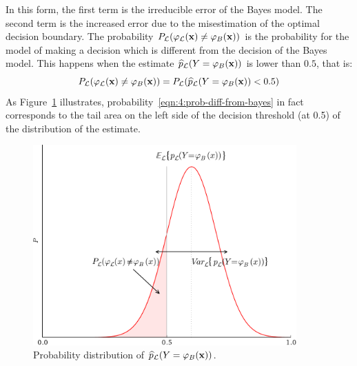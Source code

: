 In this form, the first term is the irreducible error of the Bayes model. The
second term is the increased error due to the misestimation of the optimal
decision boundary. The probability $P_{\cal L}(\varphi_{\cal L}(\mathbf{x})\neq
\varphi_B(\mathbf{x}))$  is the probability for the model of making a decision
which is different from the decision of the Bayes model. This happens
when the estimate $\widehat{p}_{\cal L}(Y=\varphi_B(\mathbf{x}))$ is lower
than $0.5$, that is:
\begin{equation}\label{eqn:4:prob-diff-from-bayes}
P_{\cal L}(\varphi_{\cal L}(\mathbf{x})\neq \varphi_B(\mathbf{x})) = P_{\cal L}(\widehat{p}_{\cal L}(Y=\varphi_B(\mathbf{x})) < 0.5)
\end{equation}
As Figure~\ref{fig:estimate-distribution} illustrates, probability~\ref{eqn:4:prob-diff-from-bayes}
in fact corresponds to the tail area on the left side
of the decision threshold (at 0.5) of the distribution of the estimate.

\begin{figure}
    \centering
    \includegraphics[width=0.9\textwidth]{figures/ch4_estimate_distribution.pdf}
    \caption{Probability distribution of $\widehat{p}_{\cal L}(Y=\varphi_B(\mathbf{x}))$.}
    \label{fig:estimate-distribution}
\end{figure}

